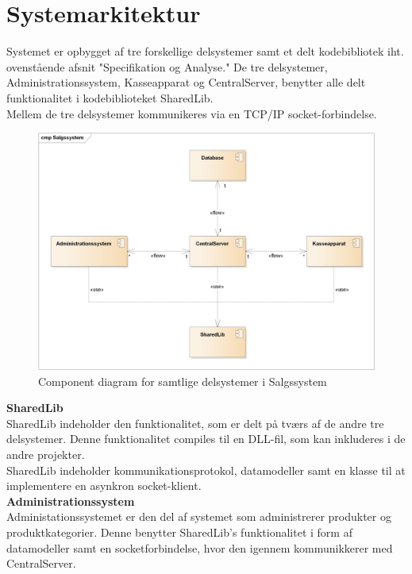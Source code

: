 \section{Systemarkitektur}
Systemet er opbygget af tre forskellige delsystemer samt et delt kodebibliotek iht. ovenstående afsnit "Specifikation og Analyse." De tre delsystemer, Administrationssystem, Kasseapparat og CentralServer, benytter alle delt funktionalitet i kodebiblioteket SharedLib.\\

Mellem de tre delsystemer kommunikeres via en TCP/IP socket-forbindelse.

\begin{figure}[H]
    \centering
    \includegraphics[width=1\textwidth]{Projektbeskrivelse/Systemarkitektur/Components.png}
    \caption{Component diagram for samtlige delsystemer i Salgssystem}
    \label{fig:CSLogging}
\end{figure}


\textbf{SharedLib}\\
SharedLib indeholder den funktionalitet, som er delt på tværs af de andre tre delsystemer. Denne funktionalitet compiles til en DLL-fil, som kan inkluderes i de andre projekter.\\

SharedLib indeholder kommunikationsprotokol, datamodeller samt en klasse til at implementere en asynkron socket-klient.\\

\textbf{Administrationssystem}\\
Administationssystemet er den del af systemet som administrerer produkter og produktkategorier. Denne benytter SharedLib's funktionalitet i form af datamodeller samt en socketforbindelse, hvor den igennem kommunikkerer med CentralServer.\\


